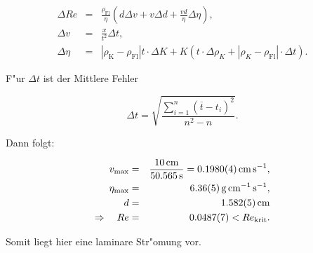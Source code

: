 		\begin{eqnarray*}
			\Delta Re & = & \frac{\rho_\mathrm{Fl}}{\eta} \left( d \Delta v + v \Delta d + \frac{vd}{\eta} \Delta \eta \right) , \\
			\Delta v & = & \frac{x}{t^2} \Delta t , \\
			\Delta \eta & = & \left|\rho_\mathrm{K} - \rho_\mathrm{Fl}\right| t \cdot \Delta K + K \left(t \cdot \Delta \rho_K + \left|\rho_K - \rho_\mathrm{Fl}\right| \cdot \Delta t \right) .
		\end{eqnarray*}

		F"ur $\Delta t$ ist der Mittlere Fehler

		\begin{equation*}
			\Delta t = \sqrt{\frac{\sum_{i=1}^{n}{\left(\overline{t} - t_i\right)^2}}{n^2 - n}} .
		\end{equation*}


		Dann folgt:

		\begin{eqnarray*}
			v_\mathrm{max} & = & \frac{\SI{10}{\centi \meter}}{\SI{50.565}{\second}} = \SI{.1980 (4)}{\centi \meter \per \second} , \\
			\eta_\mathrm{max} & = & \SI{6.36 (5)}{\gram \per \centi \meter \per \second} , \\
			d & = & \SI{1.582 (5)}{\centi \meter} \\
			\Rightarrow \quad Re & = & \SI{.0487 (7)}{} < Re_\mathrm{krit} .
		\end{eqnarray*}

		Somit liegt hier eine laminare Str"omung vor.
